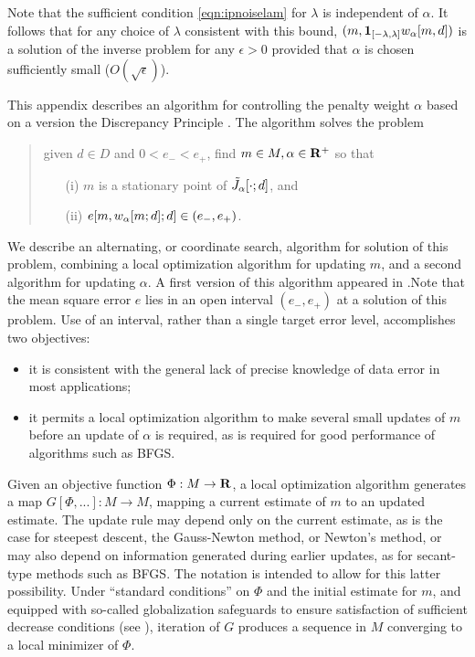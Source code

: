  Note that the sufficient condition \ref{eqn:ipnoiselam} for
$\lambda$ is independent of $\alpha$. It follows that for any choice
of $\lambda$ consistent with this bound, $(m,{\bf
  1}_{[-\lambda,\lambda]}w_{\alpha}[m,d])$ is a solution of the inverse
problem for any $\epsilon > 0$ provided that $\alpha$ is chosen
sufficiently small ($O(\sqrt{\epsilon})$).





This appendix describes an algorithm for controlling the penalty
weight $\alpha$ based on a version the Discrepancy Principle
\cite[]{EnglHankeNeubauer,Hanke:17,FuSymes2017discrepancy}. 
The algorithm solves the problem
\begin{quote}
  \label{eqn:probmod}
  given $d \in D$ and $0 < e_- < e_+$,  find  $m \in M, \alpha \in {\bf R}^+$ so that
  \begin{itemize}
  \item[(i) ]$m$ is a stationary point of $\tilde{J}_{\alpha}[\cdot;d]$, and
  \item[(ii) ]$e[m,w_{\alpha}[m;d];d] \in (e_-,e_+)$.
  \end{itemize}
\end{quote} 
We describe an alternating, or coordinate search, algorithm for
solution of this problem, combining a local optimization
algorithm for updating $m$, and a second algorithm for updating
$\alpha$. A first version of this algorithm appeared in \cite{FuSymes2017discrepancy}.Note that the mean square error $e$ lies in an open interval $(e_-,e_+)$ at a solution of this problem. Use of an interval, rather than a single target error level, accomplishes two objectives:
\begin{itemize}
    \item it is consistent with the general lack of precise knowledge of data error in most applications;
    \item it permits a local optimization algorithm to make several small updates of $m$ before an update of $\alpha$ is required, as is required for good performance of algorithms such as BFGS.
\end{itemize}

Given an
objective function $\Phi: M \rightarrow {\bf R}$, a local optimization algorithm 
generates a map $G[\Phi,...]: M \rightarrow M$, mapping a current estimate
of $m$ to an updated estimate. The update rule may depend only on the
current estimate, as is the case for steepest descent, the
Gauss-Newton method, or Newton's method, or may also depend on
information generated during earlier updates, as for secant-type
methods such as BFGS. The notation is intended to allow for this
latter possibility. Under ``standard conditions'' on $\Phi$ and the initial estimate for
$m$, and equipped with so-called globalization safeguards to ensure
satisfaction of sufficient decrease conditions
(see \cite{NocedalWright}), iteration of $G$ produces a sequence in $M$
converging to a local minimizer of $\Phi$. 

